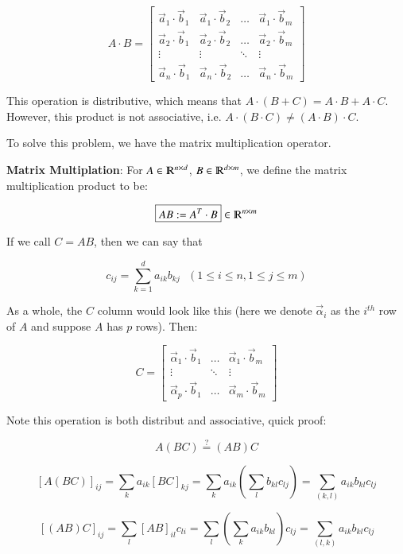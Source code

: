 \documentclass [12 pt, twoside] {book}
\newcommand\+{\text{ }}
\begin{document}
\[
    A \cdot B = \left[\begin{array}{cccc}
        \vec{a}_1 \cdot \vec{b}_1 & \vec{a}_1 \cdot \vec{b}_2 & \dots &
        \vec{a}_1 \cdot \vec{b}_m \\
        \vec{a}_2 \cdot \vec{b}_1 & \vec{a}_2 \cdot \vec{b}_2 & \dots &
        \vec{a}_2 \cdot \vec{b}_m \\
        \vdots & \vdots & \ddots & \vdots\\
        \vec{a}_n \cdot \vec{b}_1 & \vec{a}_n \cdot \vec{b}_2 & \dots &
        \vec{a}_n \cdot \vec{b}_m
    \end{array}\right]
\]

This operation is distributive, which means that $A \cdot (B + C) = A \cdot B +
A \cdot C$. However, this product is not associative, i.e. $A \cdot (B \cdot C)
\neq (A \cdot B) \cdot C$.

To solve this problem, we have the matrix multiplication operator.

\textbf{Matrix Multiplation}: For $A \in \varmathbb{R}^{n\times d}$, $B \in
\varmathbb{R}^{d\times m}$, we define the matrix multiplication product to be:

$$\boxed{AB := A^T \cdot B} \in \varmathbb{R}^{n\times m}$$

If we call $C = AB$, then we can say that

$$c_{ij} = \sum_{k = 1}^d a_{ik} b_{kj} \text{  } (1 \leq i \leq n, 1 \leq j
\leq m)$$

As a whole, the $C$ column would look like this (here we denote $\vec{\alpha}_i$
as the $i^{th}$ row of $A$ and suppose $A$ has $p$ rows). Then:

\[
    C = \left[\begin{array}{ccc}
        \vec{\alpha}_1 \cdot \vec{b}_1 & \dots & \vec{\alpha}_1 \cdot
        \vec{b}_m\\
        \vdots & \ddots & \vdots\\
        \vec{\alpha}_p \cdot \vec{b}_1 & \dots & \vec{\alpha}_m \cdot
        \vec{b}_m
    \end{array}\right]
\]

Note this operation is both distribut and associative, quick proof:

$$A (BC) \overset{?}{=} (AB) C$$

$$[A(BC)]_{ij} = \sum_{k} a_{ik} [BC]_{kj} = \sum_k a_{ik} (\sum_l b_{kl} c_{lj})
= \sum_{(k, l)} a_{ik} b_{kl} c_{lj}$$

$$[(AB)C]_{ij} = \sum_l [AB]_{il} c_{li} = \sum_l(\sum_k a_{ik} b_{kl})c_{lj} =
\sum_{(l, k)} a_{ik} b_{kl} c_{lj}$$
\end{document}
